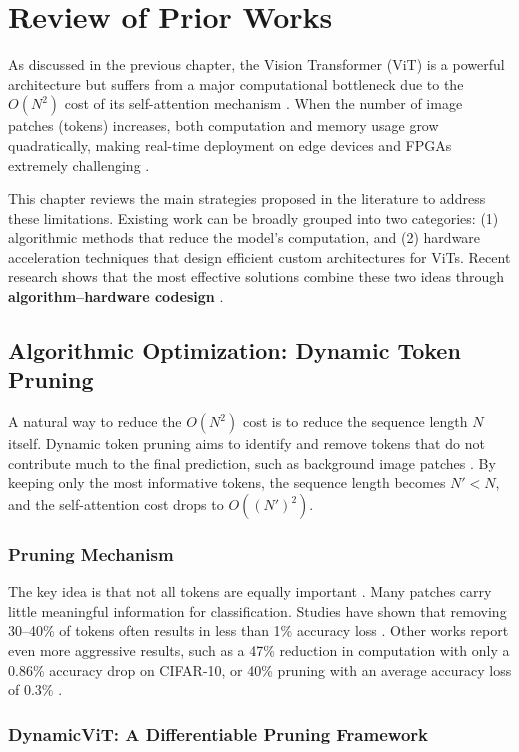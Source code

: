 \chapter{Review of Prior Works}

As discussed in the previous chapter, the Vision Transformer (ViT) is a powerful architecture but suffers from a major computational bottleneck due to the $O(N^2)$ cost of its self-attention mechanism \cite{ref2}. When the number of image patches (tokens) increases, both computation and memory usage grow quadratically, making real-time deployment on edge devices and FPGAs extremely challenging \cite{ref3}.

This chapter reviews the main strategies proposed in the literature to address these limitations. Existing work can be broadly grouped into two categories: 
(1) algorithmic methods that reduce the model’s computation, and 
(2) hardware acceleration techniques that design efficient custom architectures for ViTs. 
Recent research shows that the most effective solutions combine these two ideas through \textbf{algorithm–hardware codesign} \cite{ref4}.

\section{Algorithmic Optimization: Dynamic Token Pruning}

A natural way to reduce the $O(N^2)$ cost is to reduce the sequence length $N$ itself. Dynamic token pruning aims to identify and remove tokens that do not contribute much to the final prediction, such as background image patches \cite{ref6, ref9}. By keeping only the most informative tokens, the sequence length becomes $N' < N$, and the self-attention cost drops to $O((N')^2)$.

\subsection{Pruning Mechanism}

The key idea is that not all tokens are equally important \cite{ref13}. Many patches carry little meaningful information for classification. Studies have shown that removing 30–40\% of tokens often results in less than 1\% accuracy loss \cite{ref3}. Other works report even more aggressive results, such as a 47\% reduction in computation with only a 0.86\% accuracy drop on CIFAR-10, or 40\% pruning with an average accuracy loss of 0.3\% \cite{ref15}.

\subsection{DynamicViT: A Differentiable Pruning Framework}

